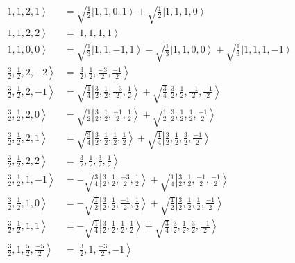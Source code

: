 \documentclass{report}
\newcommand{\ket}[1]{\left| #1 \right>} %
\begin{document}
\begin{align*}
\ket{ 1 ,  1 ,  2 ,  1  } &=  \sqrt{  \frac{1}{2}  } \ket{ 1 ,  1 ,  0 ,  1  } + \sqrt{  \frac{1}{2}  } \ket{ 1 ,  1 ,  1 ,  0  } \\
\ket{ 1 ,  1 ,  2 ,  2  } &=  \ket{ 1 ,  1 ,  1 ,  1  } \\
\ket{ 1 ,  1 ,  0 ,  0  } &=  \sqrt{  \frac{1}{3}  } \ket{ 1 ,  1 ,  -1 ,  1  } - \sqrt{  \frac{1}{3}  } \ket{ 1 ,  1 ,  0 ,  0  } + \sqrt{  \frac{1}{3}  } \ket{ 1 ,  1 ,  1 ,  -1  } \\
\ket{ \frac{3}{2} ,  \frac{1}{2} ,  2 ,  -2  } &=  \ket{ \frac{3}{2} ,  \frac{1}{2} ,  \frac{-3}{2} ,  \frac{-1}{2}  } \\
\ket{ \frac{3}{2} ,  \frac{1}{2} ,  2 ,  -1  } &=  \sqrt{  \frac{1}{4}  } \ket{ \frac{3}{2} ,  \frac{1}{2} ,  \frac{-3}{2} ,  \frac{1}{2}  } + \sqrt{  \frac{3}{4}  } \ket{ \frac{3}{2} ,  \frac{1}{2} ,  \frac{-1}{2} ,  \frac{-1}{2}  } \\
\ket{ \frac{3}{2} ,  \frac{1}{2} ,  2 ,  0  } &=  \sqrt{  \frac{1}{2}  } \ket{ \frac{3}{2} ,  \frac{1}{2} ,  \frac{-1}{2} ,  \frac{1}{2}  } + \sqrt{  \frac{1}{2}  } \ket{ \frac{3}{2} ,  \frac{1}{2} ,  \frac{1}{2} ,  \frac{-1}{2}  } \\
\ket{ \frac{3}{2} ,  \frac{1}{2} ,  2 ,  1  } &=  \sqrt{  \frac{3}{4}  } \ket{ \frac{3}{2} ,  \frac{1}{2} ,  \frac{1}{2} ,  \frac{1}{2}  } + \sqrt{  \frac{1}{4}  } \ket{ \frac{3}{2} ,  \frac{1}{2} ,  \frac{3}{2} ,  \frac{-1}{2}  } \\
\ket{ \frac{3}{2} ,  \frac{1}{2} ,  2 ,  2  } &=  \ket{ \frac{3}{2} ,  \frac{1}{2} ,  \frac{3}{2} ,  \frac{1}{2}  } \\
\ket{ \frac{3}{2} ,  \frac{1}{2} ,  1 ,  -1  } &=  - \sqrt{  \frac{3}{4}  } \ket{ \frac{3}{2} ,  \frac{1}{2} ,  \frac{-3}{2} ,  \frac{1}{2}  } + \sqrt{  \frac{1}{4}  } \ket{ \frac{3}{2} ,  \frac{1}{2} ,  \frac{-1}{2} ,  \frac{-1}{2}  } \\
\ket{ \frac{3}{2} ,  \frac{1}{2} ,  1 ,  0  } &=  - \sqrt{  \frac{1}{2}  } \ket{ \frac{3}{2} ,  \frac{1}{2} ,  \frac{-1}{2} ,  \frac{1}{2}  } + \sqrt{  \frac{1}{2}  } \ket{ \frac{3}{2} ,  \frac{1}{2} ,  \frac{1}{2} ,  \frac{-1}{2}  } \\
\ket{ \frac{3}{2} ,  \frac{1}{2} ,  1 ,  1  } &=  - \sqrt{  \frac{1}{4}  } \ket{ \frac{3}{2} ,  \frac{1}{2} ,  \frac{1}{2} ,  \frac{1}{2}  } + \sqrt{  \frac{3}{4}  } \ket{ \frac{3}{2} ,  \frac{1}{2} ,  \frac{3}{2} ,  \frac{-1}{2}  } \\
\ket{ \frac{3}{2} ,  1 ,  \frac{5}{2} ,  \frac{-5}{2}  } &=  \ket{ \frac{3}{2} ,  1 ,  \frac{-3}{2} ,  -1  } \\

\end{align*}
\end{document}
